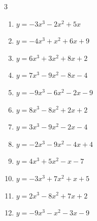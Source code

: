 \begin{multicols}{3}
\begin{enumerate}
  \item $y=-3x^{3}-2x^{2}+5x$


  \item $y=-4x^{3}+x^{2}+6x+9$


  \item $y=6x^{3}+3x^{2}+8x+2$


  \item $y=7x^{3}-9x^{2}-8x-4$


  \item $y=-9x^{3}-6x^{2}-2x-9$


  \item $y=8x^{3}-8x^{2}+2x+2$


  \item $y=3x^{3}-9x^{2}-2x-4$


  \item $y=-2x^{3}-9x^{2}-4x+4$


\columnbreak %

\resetques

  \item $y=4x^{3}+5x^{2}-x-7$


  \item $y=-3x^{3}+7x^{2}+x+5$


  \item $y=2x^{3}-8x^{2}+7x+2$


  \item $y=-9x^{3}-x^{2}-3x-9$



\end{enumerate}
\end{multicols}
